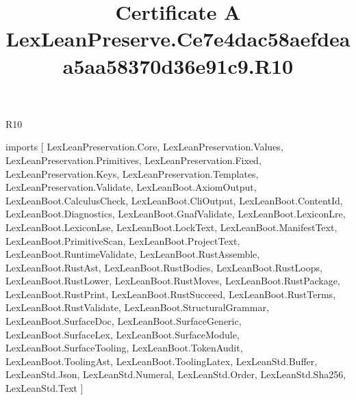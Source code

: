 \begin{lexlean}{R10}
\title{Certificate A LexLeanPreserve.Ce7e4dac58aefdeaa5aa58370d36e91c9.R10}
\begin{coremodule}
imports [
  LexLeanPreservation.Core,
  LexLeanPreservation.Values,
  LexLeanPreservation.Primitives,
  LexLeanPreservation.Fixed,
  LexLeanPreservation.Keys,
  LexLeanPreservation.Templates,
  LexLeanPreservation.Validate,
  LexLeanBoot.AxiomOutput,
  LexLeanBoot.CalculusCheck,
  LexLeanBoot.CliOutput,
  LexLeanBoot.ContentId,
  LexLeanBoot.Diagnostics,
  LexLeanBoot.GnafValidate,
  LexLeanBoot.LexiconLre,
  LexLeanBoot.LexiconLse,
  LexLeanBoot.LockText,
  LexLeanBoot.ManifestText,
  LexLeanBoot.PrimitiveScan,
  LexLeanBoot.ProjectText,
  LexLeanBoot.RuntimeValidate,
  LexLeanBoot.RustAssemble,
  LexLeanBoot.RustAst,
  LexLeanBoot.RustBodies,
  LexLeanBoot.RustLoops,
  LexLeanBoot.RustLower,
  LexLeanBoot.RustMoves,
  LexLeanBoot.RustPackage,
  LexLeanBoot.RustPrint,
  LexLeanBoot.RustSucceed,
  LexLeanBoot.RustTerms,
  LexLeanBoot.RustValidate,
  LexLeanBoot.StructuralGrammar,
  LexLeanBoot.SurfaceDoc,
  LexLeanBoot.SurfaceGeneric,
  LexLeanBoot.SurfaceLex,
  LexLeanBoot.SurfaceModule,
  LexLeanBoot.SurfaceTooling,
  LexLeanBoot.TokenAudit,
  LexLeanBoot.ToolingAst,
  LexLeanBoot.ToolingLatex,
  LexLeanStd.Buffer,
  LexLeanStd.Json,
  LexLeanStd.Numeral,
  LexLeanStd.Order,
  LexLeanStd.Sha256,
  LexLeanStd.Text
]


\end{coremodule}
\end{lexlean}
